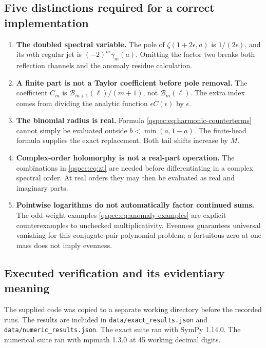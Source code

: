\documentclass[11pt,letterpaper]{article}
\numberwithin{equation}{section}
\theoremstyle{definition}
\newcommand{\Bcal}{\mathcal B}
\newcommand{\qfile}[1]{\nolinkurl{#1}}
\begin{document}
\subsection{Five distinctions required for a correct implementation}
\begin{enumerate}
\item \textbf{The doubled spectral variable.} The pole of
$\zeta(1+2\epsilon,a)$ is $1/(2\epsilon)$, and its $m$th regular
jet is $(-2)^m\gamma_m(a)$. Omitting the factor two breaks both
reflection channels and the anomaly residue calculation.
\item \textbf{A finite part is not a Taylor coefficient before pole removal.}
The coefficient $C_m$ is
$\Bcal_{m+1}(\ell)/(m+1)$, not $\Bcal_m(\ell)$. The extra index comes
from dividing the analytic function $\epsilon C(\epsilon)$ by
$\epsilon$.
\item \textbf{The binomial radius is real.} Formula
\eqref{qspec:eq:harmonic-counterterms} cannot simply be evaluated outside
$b<\min(a,1-a)$. The finite-head formula supplies the exact replacement.
Both tail shifts increase by $M$.
\item \textbf{Complex-order holomorphy is not a real-part operation.}
The combinations in \eqref{qspec:eq:zt} are needed before differentiating
in a complex spectral order. At real orders they may then be evaluated
as real and imaginary parts.
\item \textbf{Pointwise logarithms do not automatically factor continued sums.}
The odd-weight examples \eqref{qspec:eq:anomaly-examples} are explicit
counterexamples to unchecked multiplicativity. Evenness guarantees
universal vanishing for this conjugate-pair polynomial problem; a
fortuitous zero at one mass does not imply evenness.
\end{enumerate}

\subsection{Executed verification and its evidentiary meaning}
The supplied code was copied to a separate working directory before the
recorded runs. The results are included in
\qfile{data/exact_results.json} and \qfile{data/numeric_results.json}.
The exact suite ran with SymPy 1.14.0. The numerical suite ran with
mpmath 1.3.0 at 45 working decimal digits.
\end{document}
